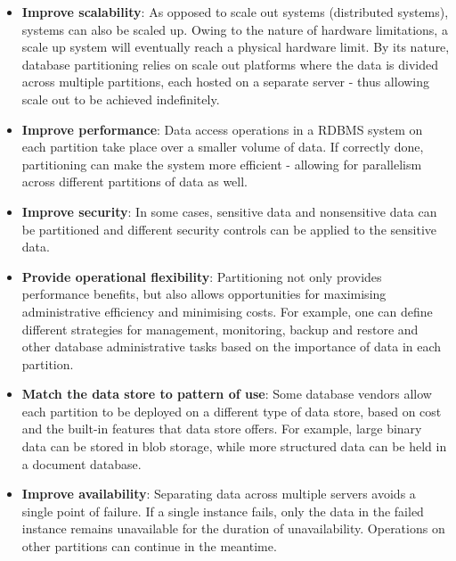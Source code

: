 \begin{itemize}
\item \textbf{Improve scalability}: As opposed to scale out systems (distributed systems), systems can also be scaled up. Owing to the nature of hardware limitations, a scale up system will eventually reach a physical hardware limit. By its nature, database partitioning relies on scale out platforms where the data is divided across multiple partitions, each hosted on a separate server - thus allowing scale out to be achieved indefinitely.
\item \textbf{Improve performance}: Data access operations in a RDBMS system on each partition take place over a smaller volume of data. If correctly done, partitioning can make the system more efficient - allowing for parallelism across different partitions of data as well.
\item \textbf{Improve security}: In some cases, sensitive data and nonsensitive data can be partitioned and different security controls can be applied to the sensitive data.
\item \textbf{Provide operational flexibility}: Partitioning not only provides performance benefits, but also allows opportunities for maximising administrative efficiency and minimising costs. For example, one can define different strategies for management, monitoring, backup and restore and other database administrative tasks based on the importance of data in each partition.
\item \textbf{Match the data store to pattern of use}: Some database vendors allow each partition to be deployed on a different type of data store, based on cost and the built-in features that data store offers. For example, large binary data can be stored in blob storage, while more structured data can be held in a document database.
\item \textbf{Improve availability}: Separating data across multiple servers avoids a single point of failure. If a single instance fails, only the data in the failed instance remains unavailable for the duration of unavailability. Operations on other partitions can continue in the meantime. 

\end{itemize}


